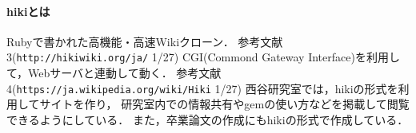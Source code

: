 \paragraph{hikiとは}
Rubyで書かれた高機能・高速Wikiクローン．
参考文献3(\verb|http://hikiwiki.org/ja/| 1/27)
CGI(Commond Gateway Interface)を利用して，Webサーバと連動して動く．
参考文献4(\verb|https://ja.wikipedia.org/wiki/Hiki| 1/27)
西谷研究室では，hikiの形式を利用してサイトを作り，
研究室内での情報共有やgemの使い方などを掲載して閲覧できるようにしている．
また，卒業論文の作成にもhikiの形式で作成している．

